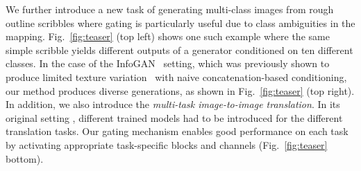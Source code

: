 We further introduce a new task of generating multi-class images from rough outline scribbles where gating is particularly useful due to class ambiguities in the mapping. Fig.~\ref{fig:teaser} (top left) shows one such example where the same simple scribble yields different outputs of a generator conditioned on ten different classes.
In the case of the InfoGAN~\cite{chen2016infogan} setting, which was previously shown to produce limited texture variation~\cite{ghosh2017multi} with naive concatenation-based conditioning, our method produces diverse generations, as shown in Fig.~\ref{fig:teaser} (top right).
In addition, we also introduce the {\em multi-task image-to-image translation}. In its original setting \cite{isola2016image2image}, different trained models had to be introduced for the different translation tasks. Our gating mechanism enables good performance on each task by activating appropriate task-specific blocks and channels (Fig.~\ref{fig:teaser} bottom).












